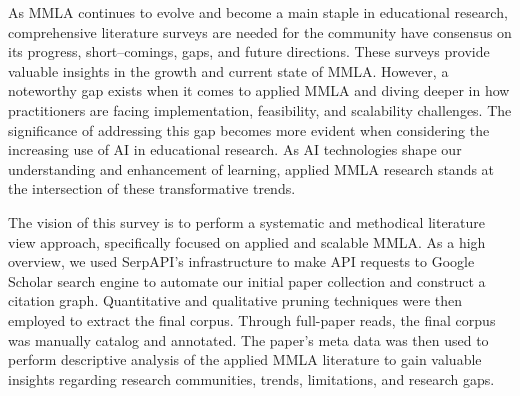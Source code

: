 \documentclass[manuscript,screen,review]{acmart}
\begin{document}
As MMLA continues to evolve and become a main staple in educational research, comprehensive literature surveys are needed for the community have consensus on its progress, short--comings, gaps, and future directions. These surveys provide valuable insights in the growth and current state of MMLA. However, a noteworthy gap exists when it comes to applied MMLA and diving deeper in how practitioners are facing implementation, feasibility, and scalability challenges. The significance of addressing this gap becomes more evident when considering the increasing use of AI in educational research. As AI technologies shape our understanding and enhancement of learning, applied MMLA research stands at the intersection of these transformative trends.

The vision of this survey is to perform a systematic and methodical literature view approach, specifically focused on applied and scalable MMLA. As a high overview, we used SerpAPI's infrastructure to make API requests to Google Scholar search engine to automate our initial paper collection and construct a citation graph. Quantitative and qualitative pruning techniques were then employed to extract the final corpus. Through full-paper reads, the final corpus was manually catalog and annotated. The paper's meta data was then used to perform descriptive analysis of the applied MMLA literature to gain valuable insights regarding research communities, trends, limitations, and research gaps. 
\end{document}
